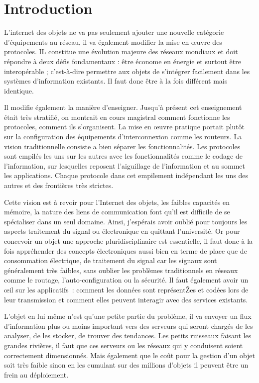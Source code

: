 
\chapter*{Introduction}
L'internet des objets ne va pas seulement ajouter une nouvelle catégorie d'équipements au réseau, il va également modifier la mise en \oe{}uvre des protocoles.
IL constitue une évolution majeure des réseaux mondiaux et doit répondre à deux défis fondamentaux : être économe en énergie et surtout être interopérable ; c'est-à-dire permettre aux objets de s’intégrer facilement dans les systèmes d’information existants. Il faut donc être à la fois différent mais identique. 

Il modifie également la manière d'enseigner. Jusqu'à présent cet enseignement était très stratifié, on montrait en cours magistral comment fonctionne les protocoles, comment ils s'organisent. La mise en \oe{}uvre pratique portait plutôt sur la configuration des équipements d'interconnexion comme les routeurs. La vision traditionnelle consiste a bien séparer les fonctionnalités. Les protocoles sont empilés les uns sur les autres avec les fonctionnalités comme le codage de l'information, sur lesquelles reposent l'aiguillage de l'information et au sommet les  applications. Chaque protocole dans cet empilement  indépendant les uns des autres et des frontières très strictes. 



Cette vision est à revoir pour l'Internet des objets, les faibles capacités en mémoire, la nature des liens de communication font qu'il est difficile de se spécialiser dans un seul domaine. Ainsi, j'espérais avoir oublié pour toujours les aspects traitement du signal ou électronique en quittant l'université. Or pour concevoir un objet une approche pluridisciplinaire est essentielle, il faut donc à la fois appréhender des concepts électroniques aussi bien en terme de place que de consommation électrique, de traitement du signal car les signaux sont généralement très faibles, sans oublier les problèmes traditionnels en réseaux comme le routage, l'auto-configuration ou la sécurité. Il faut également avoir un \oe{}il sur les  applicatifs~:  comment les données sont représentŽes et codées lors de leur transmission et comment elles peuvent interagir avec des services existants. 

L'objet en lui même n'est qu'une petite partie du problème, il va envoyer un flux d'information plus ou moins important vers des serveurs qui seront chargés de les analyser, de les stocker, de trouver des tendances. Les petits ruisseaux faisant les grandes rivières, il faut que ces serveurs ou les réseaux qui y conduisent soient correctement dimensionnés. Mais également que le coût pour la gestion d'un objet soit très faible sinon en les cumulant sur des millions d'objets il peuvent être un frein au déploiement.


